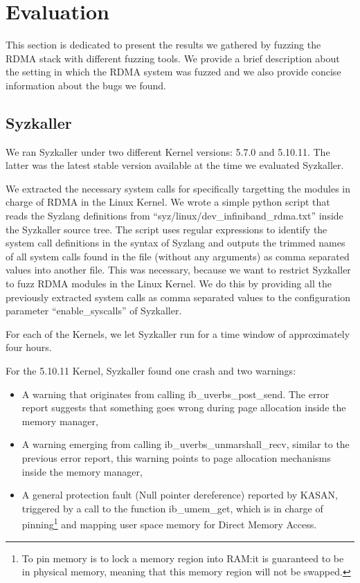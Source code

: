 \section{Evaluation}\label{s:evaluation}

This section is dedicated to present the results we gathered
by fuzzing the RDMA stack with different fuzzing tools. We provide
a brief description about the setting in which the RDMA system was fuzzed
and we also provide concise information about the bugs we found.



\subsection{Syzkaller}

We ran Syzkaller under two different Kernel versions: 5.7.0 and 5.10.11. The latter was
the latest stable version available at the time we evaluated Syzkaller.

We extracted the necessary system calls for specifically targetting the modules
in charge of RDMA in the Linux Kernel. We wrote a simple python script
that reads the Syzlang definitions from ``syz/linux/dev\_infiniband\_rdma.txt'' inside the
Syzkaller source tree. The script uses regular expressions to identify the system call definitions
in the syntax of Syzlang and outputs the trimmed names of all system calls found in the file (without any arguments)
as comma separated values into another file. This was necessary, because we want to restrict Syzkaller
to fuzz RDMA modules in the Linux Kernel. We do this by providing all the previously extracted system calls
as comma separated values to the configuration parameter ``enable\_syscalls'' of Syzkaller.

For each of the Kernels, we let Syzkaller run for a time window of approximately four hours.

For the 5.10.11 Kernel, Syzkaller found one crash and two warnings:
\begin{itemize}
  \item A warning that originates from calling ib\_uverbs\_post\_send. The error report suggests that something goes wrong during page allocation inside the memory manager, %
  \item A warning emerging from calling ib\_uverbs\_unmarshall\_recv, similar to the previous error report, this warning points to page allocation mechanisms inside the memory manager,
  \item A general protection fault (Null pointer dereference) reported by KASAN, triggered by a call to the function ib\_umem\_get, which is in charge of pinning\footnote{To pin memory is to lock a memory region into RAM:\@ it is guaranteed to be in physical memory, meaning that this memory region will not be swapped\cite{kerriskLinuxProgrammingInterface2010}.} and mapping user space memory for Direct Memory Access.  %
\end{itemize}

